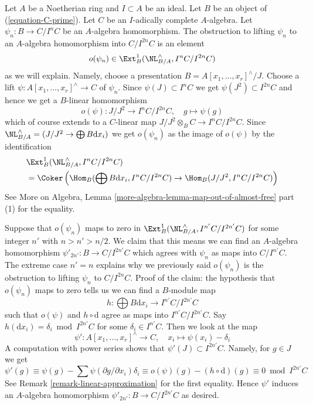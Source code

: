 \begin{remark}
\label{remark-improve-homomorphism}
Let $A$ be a Noetherian ring and $I \subset A$ be an ideal.
Let $B$ be an object of (\ref{equation-C-prime}).
Let $C$ be an $I$-adically complete $A$-algebra.
Let $\psi_n : B \to C/I^nC$ be an $A$-algebra homomorphism.
The obstruction to lifting $\psi_n$ to an $A$-algebra
homomorphism into $C/I^{2n}C$ is an element
$$
o(\psi_n) \in \Ext^1_B(\NL_{B/A}^\wedge, I^nC/I^{2n}C)
$$
as we will explain. Namely, choose a presentation
$B = A[x_1, \ldots, x_r]^\wedge/J$.
Choose a lift $\psi : A[x_1, \ldots, x_r]^\wedge \to C$ of $\psi_n$.
Since $\psi(J) \subset I^nC$ we get $\psi(J^2) \subset I^{2n}C$
and hence we get a $B$-linear homomorphism
$$
o(\psi) :
J/J^2 \longrightarrow I^nC/I^{2n}C, \quad g \longmapsto \psi(g)
$$
which of course extends to a $C$-linear map
$J/J^2 \otimes_B C \to I^nC/I^{2n}C$.
Since $\NL_{B/A}^\wedge = (J/J^2 \to \bigoplus B \text{d}x_i)$
we get $o(\psi_n)$ as the image of $o(\psi)$ by the identification
\begin{align*}
& \Ext^1_B(\NL_{B/A}^\wedge, I^nC/I^{2n}C) \\
& =
\Coker\left(\Hom_B(\bigoplus B\text{d}x_i, I^nC/I^{2n}C) \to
\Hom_B(J/J^2, I^nC/I^{2n}C)\right)
\end{align*}
See More on Algebra, Lemma
\ref{more-algebra-lemma-map-out-of-almost-free} part (1) for the equality.

\medskip\noindent
Suppose that $o(\psi_n)$ maps to zero in
$\Ext^1_B(\NL_{B/A}^\wedge, I^{n'}C/I^{2n'}C)$
for some integer $n'$ with $n > n' > n/2$. We claim that this means we can
find an $A$-algebra homomorphism $\psi'_{2n'} : B \to C/I^{2n'}C$
which agrees with $\psi_n$ as maps into $C/I^{n'}C$.
The extreme case $n' = n$ explains why we previously said
$o(\psi_n)$ is the obstruction to lifting $\psi_n$ to $C/I^{2n}C$.
Proof of the claim: the hypothesis that $o(\psi_n)$ maps to zero tells us
we can find a $B$-module map
$$
h : \bigoplus B\text{d}x_i \longrightarrow I^{n'}C/I^{2n'}C
$$
such that $o(\psi)$ and $h \circ \text{d}$ agree as maps
into $I^{n'}C/I^{2n'}C$. Say $h(\text{d}x_i) = \delta_i \bmod I^{2n'}C$
for some $\delta_i \in I^{n'}C$. Then we look at the map
$$
\psi' : A[x_1, \ldots, x_r]^\wedge \to C,\quad
x_i \longmapsto \psi(x_i) - \delta_i
$$
A computation with power series
shows that $\psi'(J) \subset I^{2n'}C$. Namely, for $g \in J$ we get
$$
\psi'(g) \equiv
\psi(g) - \sum \psi(\partial g/\partial x_i)\delta_i \equiv
o(\psi)(g) - (h \circ \text{d})(g) \equiv
0 \bmod I^{2n'}C
$$
See Remark \ref{remark-linear-approximation} for the first equality.
Hence $\psi'$ induces an $A$-algebra homomorphism
$\psi'_{2n'} : B \to C/I^{2n'}C$ as desired.
\end{remark}

